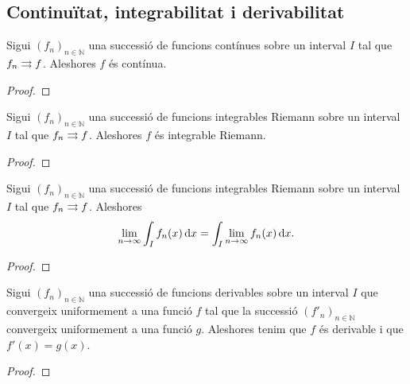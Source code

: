 \documentclass[../../Main.tex]{subfiles}
\begin{document}
	\subsection{Continuïtat, integrabilitat i derivabilitat}
	\begin{theorem}
		\label{thm:si una successió de funcions contínues convergeix uniformement, ho fa a una funció contínua}
		Sigui \((f_{n})_{n\in\mathbb{N}}\) una successió de funcions contínues sobre un interval \(I\) tal que \(f_{n}\mathrel{\rightrightarrows} f\). Aleshores \(f\) és contínua.
		\begin{proof}
		\end{proof}
	\end{theorem}
	\begin{theorem}
		\label{thm:si una successió de funcions integrables Riemann convergix unifoemement, ho fa a una funció integrable Riemann}
		Sigui \((f_{n})_{n\in\mathbb{N}}\) una successió de funcions integrables Riemann sobre un interval \(I\) tal que \(f_{n}\mathrel{\rightrightarrows} f\). Aleshores \(f\) és integrable Riemann.
		\begin{proof}
		\end{proof}
	\end{theorem}
	\begin{theorem}
		\label{thm:si una successió de funcions convergeix uniformement aleshores el límit de la integral dels elements de la succesió és la integral del límit dels elements de la successió}
		Sigui \((f_{n})_{n\in\mathbb{N}}\) una successió de funcions integrables Riemann sobre un interval \(I\) tal que \(f_{n}\mathrel{\rightrightarrows} f\). Aleshores
		\[\lim_{n\to\infty}\int_{I}f_{n}(x)\mathop{}\!\mathrm{d} x=\int_{I}\lim_{n\to\infty}f_{n}(x)\mathop{}\!\mathrm{d} x.\]
		\begin{proof}
		\end{proof}
	\end{theorem}
	\begin{theorem}
		\label{thm:condició per la derivabilitat d'una successió de funcions}
		Sigui \((f_{n})_{n\in\mathbb{N}}\) una successió de funcions derivables sobre un interval \(I\) que convergeix uniformement a una funció \(f\) tal que la successió \((f'_{n})_{n\in\mathbb{N}}\) convergeix uniformement a una funció \(g\). Aleshores tenim que \(f\) és derivable i que \(f'(x)=g(x)\).
		\begin{proof} %
		\end{proof}
	\end{theorem}
\end{document}
